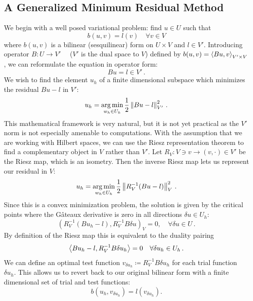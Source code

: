 \documentclass{article}
\theoremstyle{definition}
\theoremstyle{remark}
\begin{document}
\subsection{A Generalized Minimum Residual Method}
We begin with a well posed variational problem: find $u\in U$ such that
\[
b(u,v)=l(v) \quad\forall v\in V
\]
where $b(u,v)$ is a bilinear (sesquilinear) form on $U\times V$ and $l\in V'$.
Introducing operator $B:U\rightarrow V'\quad$ ($V'$ is the dual space to $V$) defined by $b(u,v)=\left\langle Bu,v \right\rangle_{V'\times V}$,
we can reformulate the equation in operator form:
\[
Bu=l\in V'\,.
\]
We wish to find the element $u_h$ of a finite dimensional subspace which minimizes the residual $Bu-l$ in $V'$:
\[
u_h=\operatorname*{arg\,min}_{w_h\in U_h}\frac{1}{2}\left\| Bu-l \right\|^2_{V'}\,.
\]
This mathematical framework is very natural, but it is not yet practical as the $V'$ norm is not especially amenable to computations.
With the assumption that we are working with Hilbert spaces, 
we can use the Riesz representation theorem to find a complementary object in $V$ rather than $V'$. 
Let $R_V:V\ni v\rightarrow(v,\cdot)\in V'$ be the Riesz map, which is an isometry. 
Then the inverse Riesz map lets us represent our residual in $V$:
\[
u_h=\operatorname*{arg\,min}_{w_h\in U_h}\frac{1}{2}\left\| R_V^{-1}(Bu-l) \right\|^2_{V}\,.
\]
Since this is a convex minimization problem, 
the solution is given by the critical points where the 
G\^ateaux derivative is zero in all directions $\delta u \in
U_h$:
\[
\left(R_V^{-1}(Bu_h-l),R_V^{-1}B\delta u\right)_V = 0, \quad \forall \delta u \in U\,.
\]
By definition of the Riesz map this is equivalent to the duality pairing
\begin{equation*}
\left\langle Bu_h-l,R_V^{-1}B\delta u_h \right\rangle=0\quad\forall\delta u_h\in U_h\,.
\end{equation*}
We can define an optimal test function $v_{\delta u_h}\coloneqq R_V^{-1}B\delta u_h$ for each trial function $\delta u_h$.
This allows us to revert back to our original bilinear form with a finite dimensional set of trial and test functions:
\begin{equation*}
b(u_h,v_{\delta u_h})=l(v_{\delta u_h}).
\end{equation*}
\end{document}
